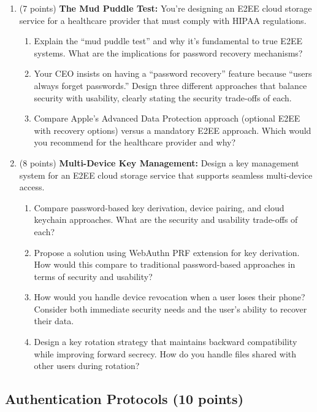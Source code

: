 \documentclass[10pt,a4paper,american]{exam}
\begin{document}
\begin{enumerate}
	\item (7 points) \textbf{The Mud Puddle Test:}
	      You're designing an E2EE cloud storage service for a healthcare provider that must comply with HIPAA regulations.
	      \begin{enumerate}
		      \item Explain the ``mud puddle test'' and why it's fundamental to true E2EE systems. What are the implications for password recovery mechanisms?
		      \item Your CEO insists on having a ``password recovery'' feature because ``users always forget passwords.'' Design three different approaches that balance security with usability, clearly stating the security trade-offs of each.
		      \item Compare Apple's Advanced Data Protection approach (optional E2EE with recovery options) versus a mandatory E2EE approach. Which would you recommend for the healthcare provider and why?
	      \end{enumerate}
	\item (8 points) \textbf{Multi-Device Key Management:}
	      Design a key management system for an E2EE cloud storage service that supports seamless multi-device access.
	      \begin{enumerate}
		      \item Compare password-based key derivation, device pairing, and cloud keychain approaches. What are the security and usability trade-offs of each?
		      \item Propose a solution using WebAuthn PRF extension for key derivation. How would this compare to traditional password-based approaches in terms of security and usability?
		      \item How would you handle device revocation when a user loses their phone? Consider both immediate security needs and the user's ability to recover their data.
		      \item Design a key rotation strategy that maintains backward compatibility while improving forward secrecy. How do you handle files shared with other users during rotation?
	      \end{enumerate}
\end{enumerate}

\subsection{Authentication Protocols (10 points)}
\end{document}

